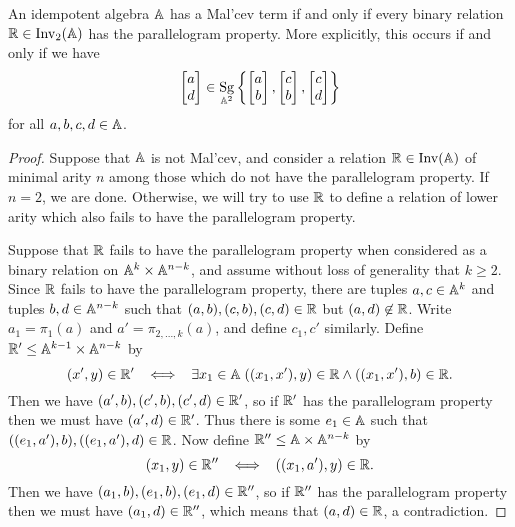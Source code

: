\documentclass[letterpaper,11pt]{article}
\DeclareMathOperator{\Inv}{Inv}
\DeclareMathOperator{\Sg}{Sg}
\begin{document}
\begin{thm} An idempotent algebra $\mathbb{A}$ has a Mal'cev term if and only if every binary relation $\RR \in \Inv_2(\bA)$ has the parallelogram property. More explicitly, this occurs if and only if we have
\[
\begin{bmatrix}a\\ d\end{bmatrix} \in \Sg_{\bA^2}\left\{\begin{bmatrix}a\\ b\end{bmatrix}, \begin{bmatrix}c\\ b\end{bmatrix}, \begin{bmatrix}c\\ d\end{bmatrix}\right\}
\]
for all $a,b,c,d \in \mathbb{A}$.
\end{thm}
\begin{proof} Suppose that $\mathbb{A}$ is not Mal'cev, and consider a relation $\RR \in \Inv(\bA)$ of minimal arity $n$ among those which do not have the parallelogram property. If $n=2$, we are done. Otherwise, we will try to use $\mathbb{R}$ to define a relation of lower arity which also fails to have the parallelogram property.

Suppose that $\mathbb{R}$ fails to have the parallelogram property when considered as a binary relation on $\mathbb{A}^k \times \mathbb{A}^{n-k}$, and assume without loss of generality that $k \ge 2$. Since $\mathbb{R}$ fails to have the parallelogram property, there are tuples $a,c \in \mathbb{A}^k$ and tuples $b,d \in \mathbb{A}^{n-k}$ such that $(a,b), (c,b), (c,d) \in \mathbb{R}$ but $(a,d) \not\in \mathbb{R}$. Write $a_1 = \pi_1(a)$ and $a' = \pi_{2, ..., k}(a)$, and define $c_1, c'$ similarly. Define $\mathbb{R}' \le \mathbb{A}^{k-1}\times \mathbb{A}^{n-k}$ by
\[
(x',y) \in \mathbb{R}' \;\; \iff \;\; \exists x_1 \in \mathbb{A} \; ((x_1,x'),y) \in \mathbb{R} \wedge ((x_1,x'),b) \in \mathbb{R}.
\]
Then we have $(a',b), (c',b), (c',d) \in \mathbb{R}'$, so if $\mathbb{R}'$ has the parallelogram property then we must have $(a',d) \in \mathbb{R}'$. Thus there is some $e_1 \in \mathbb{A}$ such that $((e_1,a'),b), ((e_1,a'),d) \in \mathbb{R}$. Now define $\mathbb{R}'' \le \mathbb{A} \times \mathbb{A}^{n-k}$ by
\[
(x_1,y) \in \mathbb{R}'' \;\; \iff \;\; ((x_1,a'),y) \in \mathbb{R}.
\]
Then we have $(a_1,b), (e_1,b), (e_1,d) \in \mathbb{R}''$, so if $\mathbb{R}''$ has the parallelogram property then we must have $(a_1,d) \in \mathbb{R}''$, which means that $(a,d) \in \mathbb{R}$, a contradiction.
\end{proof}
\end{document}
